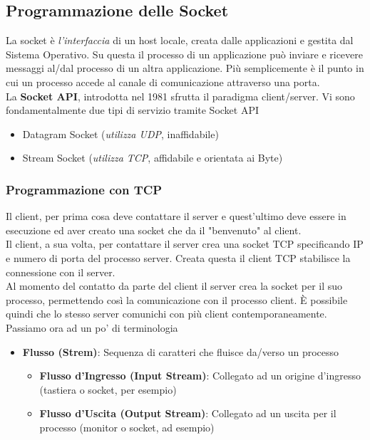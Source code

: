 \documentclass{article}
\begin{document}
        \subsection{Programmazione delle Socket}
            La socket è \textit{l'interfaccia} di un host locale, creata dalle applicazioni e gestita dal Sistema Operativo. Su questa il processo di un applicazione può inviare e ricevere messaggi al/dal processo di un altra applicazione. Più semplicemente è il punto in cui un processo accede al canale di comunicazione attraverso una porta.\\
            La \textbf{Socket API}, introdotta nel 1981 sfrutta il paradigma client/server. Vi sono fondamentalmente due tipi di servizio tramite Socket API
            \begin{itemize}
                \item Datagram Socket (\textit{utilizza UDP}, inaffidabile)
                \item Stream Socket (\textit{utilizza TCP}, affidabile e orientata ai Byte)
            \end{itemize} 

            \subsubsection{Programmazione con TCP}
                Il client, per prima cosa deve contattare il server e quest'ultimo deve essere in esecuzione ed aver creato una socket che da il "benvenuto" al client.\\
                Il client, a sua volta, per contattare il server crea una socket TCP specificando IP e numero di porta del processo server. Creata questa il client TCP stabilisce la connessione con il server.\\
                Al momento del contatto da parte del client il server crea la socket per il suo processo, permettendo così la comunicazione con il processo client. È possibile quindi che lo stesso server comunichi con più client contemporaneamente.\\
                Passiamo ora ad un po' di terminologia
                \begin{itemize}
                    \item \textbf{Flusso (Strem)}: Sequenza di caratteri che fluisce da/verso un processo
                          \begin{itemize}
                              \item \textbf{Flusso d'Ingresso (Input Stream)}: Collegato ad un origine d'ingresso (tastiera o socket, per esempio)
                              \item \textbf{Flusso d'Uscita (Output Stream)}: Collegato ad un uscita per il processo (monitor o socket, ad esempio)
                          \end{itemize} 
                \end{itemize}
\end{document}

